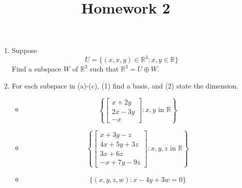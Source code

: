 \documentclass[a4paper,11pt]{article}
\title{Homework 2}
\newcommand{\re}{\mathbb{R}}
\begin{document}
\maketitle


\begin{enumerate}

\item Suppose
$$U=\{(x,x,y)\in\mathbb{R}^3: x, y \in \re\}$$
Find a subspace $W$ of $\re^3$ such that $\re^3=U\oplus W$.


 \item For each subspace in (a)-(c), (1) find a basis, and (2) state the dimension.

 \begin{itemize}

  \item[(a)]

  $$
\left\{\left[\begin{array}{c}
x+ 2y \\
2x-3y \\
-x
\end{array}\right]: x, y \text { in } \mathbb{R}\right\}
$$

  \item[(b)]
$$
\left\{\left[\begin{array}{c}
x+ 3y-z \\
4x+5y+3z \\
3x+6z \\
-x+7y-9z
\end{array}\right]: x, y, z \text { in } \mathbb{R}\right\}
$$
  \item[(c)]
$$
\{(x, y, z, w): x-4 y+3w=0\}
$$
 \end{itemize}




\end{enumerate}
\end{document}
